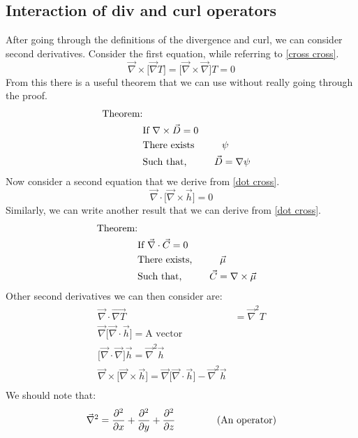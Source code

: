 \documentclass[a4paper, reqno, 12pt, openbib]{article} %
\begin{document}
\subsection{Interaction of div and curl operators}
After going through the definitions of the divergence and curl, we can consider second derivatives. Consider the first equation, while referring to \autoref{cross cross}.
\begin{equation}
\vec{\nabla} \times \Big[ \vec{\nabla} T \Big] = \Big[ \vec{\nabla} \times \vec{\nabla} \Big]T = 0
\end{equation}
From this there is a useful theorem that we can use without really going through the proof. 
\begin{align*}
	\label{curl grad}
	\text{Theorem:}\\
		&\text{If $\nabla \times \vec{D}$} = 0\\
		&\text{There exists} \hspace{10mm}  \psi\\
		&\text{Such that,} \hspace{10mm} \vec{D} = \nabla \psi
\end{align*}
Now consider a second equation that we derive from \autoref{dot cross}. 
\begin{equation}
	\vec{\nabla} \cdot \Big[ \vec{\nabla} \times \vec{h} \Big] = 0
\end{equation}
Similarly, we can write another result that we can derive from \autoref{dot cross}. 
\begin{align*}
	\label{div curl}
	\text{Theorem:}\\
		&\text{If $\vec{\nabla} \cdot \vec{C}  = 0$}\\
		&\text{There exists,} \hspace{10mm} \vec{\mu}\\
		&\text{Such that,} \hspace{10mm} \vec{C} = \nabla \times \vec{\mu}
\end{align*}
Other second derivatives we can then consider are: 
\begin{align}
	\vec{\nabla} \cdot \vec{\nabla T} &= \vec{\nabla}^{2}T\\
	\vec{\nabla} \Big[ \vec{\nabla} \cdot \vec{h} \Big] = \text{A vector}\\
	\Big[ \vec{\nabla} \cdot \vec{\nabla} \Big]\vec{h} = \vec{\nabla}^{2}\vec{h}\\
	\vec{\nabla} \times \Big[ \vec{\nabla} \times \vec{h} \Big] = \vec{\nabla}\Big[ \vec{\nabla} \cdot \vec{h} \Big] - \vec{\nabla}^{2}\vec{h}\\
\end{align} 
We should note that: 
\begin{equation} 
	\vec{\nabla}^{2} = \frac{\partial^{2}}{\partial x} + \frac{\partial^{2}}{\partial y} + \frac{\partial^{2}}{\partial z} \hspace{15mm} \text{(An operator)}
\end{equation}






 


 
\end{document}
